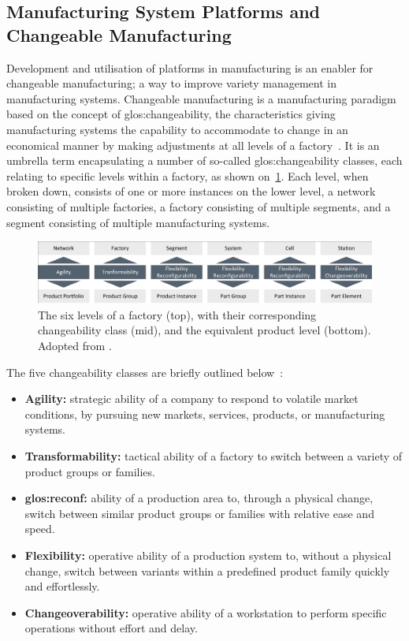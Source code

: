 \subsection{Manufacturing System Platforms and Changeable Manufacturing}\label{ssec:pPlatforms}
Development and utilisation of platforms in manufacturing is an enabler for changeable manufacturing; a way to improve variety management in manufacturing systems.
Changeable manufacturing is a manufacturing paradigm based on the concept of \gls{glos:changeability}, \ie{} the characteristics giving manufacturing systems the capability to accommodate to change in an economical manner by making adjustments at all levels of a factory~\parencite{HodaC}.
It is an umbrella term encapsulating a number of so-called \gls{glos:changeability} classes, each relating to specific levels within a factory, as shown on~\cref{fig:chngbltyClasses}.
Each level, when broken down, consists of one or more instances on the lower level, \eg{} a network consisting of multiple factories, a factory consisting of multiple segments, and a segment consisting of multiple manufacturing systems.
\begin{figure}[tb]
	\centering
	\includegraphics[width=\textwidth, trim=3 3 3 3, clip]{mainmatter/introduction/figures/factoryLevels.pdf}
	\caption[The six levels of a factory, their corresponding changeability class and equivalent product level.]
	{The six levels of a factory (top), with their corresponding changeability class (mid), and the equivalent product level (bottom).
	Adopted from \textcite{HodaC}.}\label{fig:chngbltyClasses}
\end{figure}
The five changeability classes are briefly outlined below~\parencite{HodaC}:
\begin{itemize}
	\item \textbf{Agility:} strategic ability of a company to respond to volatile market conditions, \eg{} by pursuing new markets, services, products, or manufacturing systems.
	\item \textbf{Transformability:} tactical ability of a factory to switch between a variety of product groups or families.
	\item \textbf{\Gls{glos:reconf}:} ability of a production area to, through a physical change, switch between similar product groups or families with relative ease and speed.
	\item \textbf{Flexibility:} operative ability of a production system to, without a physical change, switch between variants within a predefined product family quickly and effortlessly.
	\item \textbf{Changeoverability:} operative ability of a workstation to perform specific operations without effort and delay.
\end{itemize}
